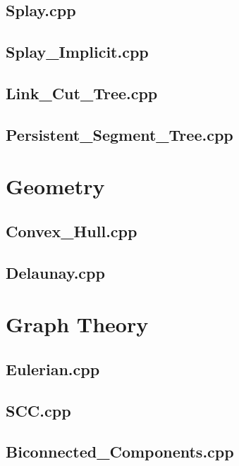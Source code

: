 \subsection{Splay.cpp}

\subsection{Splay\_Implicit.cpp}

\subsection{Link\_Cut\_Tree.cpp}

\subsection{Persistent\_Segment\_Tree.cpp}

\section{Geometry}
\subsection{Convex\_Hull.cpp}

\subsection{Delaunay.cpp}

\section{Graph Theory}
\subsection{Eulerian.cpp}

\subsection{SCC.cpp}

\subsection{Biconnected\_Components.cpp}

